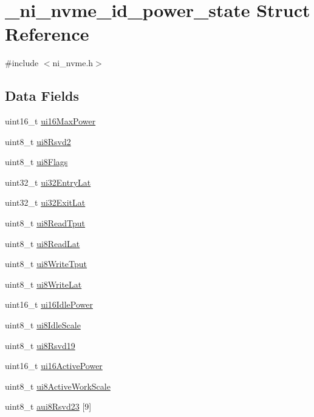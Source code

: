 \hypertarget{struct__ni__nvme__id__power__state}{}\section{\+\_\+ni\+\_\+nvme\+\_\+id\+\_\+power\+\_\+state Struct Reference}
\label{struct__ni__nvme__id__power__state}


{\ttfamily \#include $<$ni\+\_\+nvme.\+h$>$}

\subsection*{Data Fields}
\begin{DoxyCompactItemize}
\item 
uint16\+\_\+t \mbox{\hyperlink{struct__ni__nvme__id__power__state_a11c3ed9aea0c1454fa8360b7fddb586b}{ui16\+Max\+Power}}
\item 
uint8\+\_\+t \mbox{\hyperlink{struct__ni__nvme__id__power__state_a030b31d1ed9d2c2e2426adab98dbca3f}{ui8\+Rsvd2}}
\item 
uint8\+\_\+t \mbox{\hyperlink{struct__ni__nvme__id__power__state_a0f38c5901b0f51848560918beaa7e323}{ui8\+Flags}}
\item 
uint32\+\_\+t \mbox{\hyperlink{struct__ni__nvme__id__power__state_a06021ca920093dec51a6c35875842251}{ui32\+Entry\+Lat}}
\item 
uint32\+\_\+t \mbox{\hyperlink{struct__ni__nvme__id__power__state_a32dd91cd98cdbff7725b6cf5fce53cf8}{ui32\+Exit\+Lat}}
\item 
uint8\+\_\+t \mbox{\hyperlink{struct__ni__nvme__id__power__state_a15ddb9f78eb205f9c7a21bc3b78d3068}{ui8\+Read\+Tput}}
\item 
uint8\+\_\+t \mbox{\hyperlink{struct__ni__nvme__id__power__state_a7ebaeac34f9c6e277f234e56abac521b}{ui8\+Read\+Lat}}
\item 
uint8\+\_\+t \mbox{\hyperlink{struct__ni__nvme__id__power__state_a00f0f3da4cd85591d84f7027c5d22858}{ui8\+Write\+Tput}}
\item 
uint8\+\_\+t \mbox{\hyperlink{struct__ni__nvme__id__power__state_a66a062338c52453bc83d62aea5a0ba61}{ui8\+Write\+Lat}}
\item 
uint16\+\_\+t \mbox{\hyperlink{struct__ni__nvme__id__power__state_ae71bb513e7981aeacf87ec6a26e96f5d}{ui16\+Idle\+Power}}
\item 
uint8\+\_\+t \mbox{\hyperlink{struct__ni__nvme__id__power__state_a60c5e1950ba085cccc3ac3d44c0155c5}{ui8\+Idle\+Scale}}
\item 
uint8\+\_\+t \mbox{\hyperlink{struct__ni__nvme__id__power__state_a15f1844884658c4c7deaa717d572c8ad}{ui8\+Rsvd19}}
\item 
uint16\+\_\+t \mbox{\hyperlink{struct__ni__nvme__id__power__state_a0e2198436cc6197a92c4e9da481277a7}{ui16\+Active\+Power}}
\item 
uint8\+\_\+t \mbox{\hyperlink{struct__ni__nvme__id__power__state_adc02ca520aba529c9da2dcd056dbd95d}{ui8\+Active\+Work\+Scale}}
\item 
uint8\+\_\+t \mbox{\hyperlink{struct__ni__nvme__id__power__state_affcbe5447aef2de3b43c5fcbfc2da6ca}{aui8\+Rsvd23}} \mbox{[}9\mbox{]}
\end{DoxyCompactItemize}


